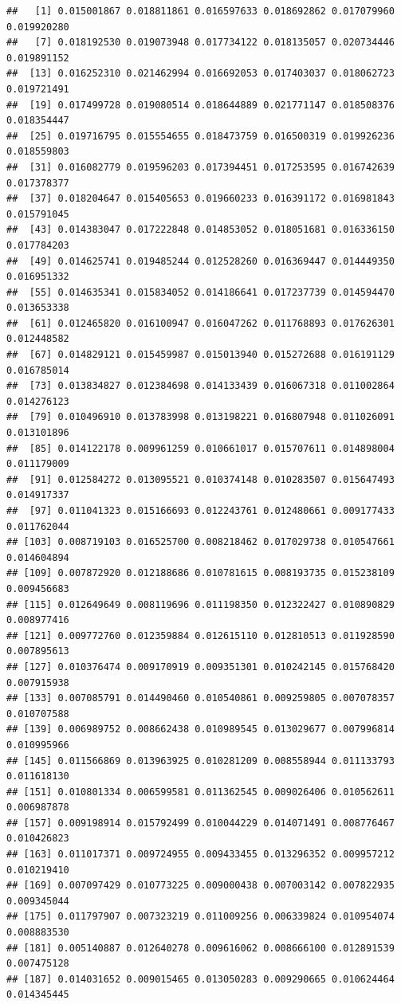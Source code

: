 \documentclass[
]{article}
\begin{document}
\begin{verbatim}
##   [1] 0.015001867 0.018811861 0.016597633 0.018692862 0.017079960 0.019920280
##   [7] 0.018192530 0.019073948 0.017734122 0.018135057 0.020734446 0.019891152
##  [13] 0.016252310 0.021462994 0.016692053 0.017403037 0.018062723 0.019721491
##  [19] 0.017499728 0.019080514 0.018644889 0.021771147 0.018508376 0.018354447
##  [25] 0.019716795 0.015554655 0.018473759 0.016500319 0.019926236 0.018559803
##  [31] 0.016082779 0.019596203 0.017394451 0.017253595 0.016742639 0.017378377
##  [37] 0.018204647 0.015405653 0.019660233 0.016391172 0.016981843 0.015791045
##  [43] 0.014383047 0.017222848 0.014853052 0.018051681 0.016336150 0.017784203
##  [49] 0.014625741 0.019485244 0.012528260 0.016369447 0.014449350 0.016951332
##  [55] 0.014635341 0.015834052 0.014186641 0.017237739 0.014594470 0.013653338
##  [61] 0.012465820 0.016100947 0.016047262 0.011768893 0.017626301 0.012448582
##  [67] 0.014829121 0.015459987 0.015013940 0.015272688 0.016191129 0.016785014
##  [73] 0.013834827 0.012384698 0.014133439 0.016067318 0.011002864 0.014276123
##  [79] 0.010496910 0.013783998 0.013198221 0.016807948 0.011026091 0.013101896
##  [85] 0.014122178 0.009961259 0.010661017 0.015707611 0.014898004 0.011179009
##  [91] 0.012584272 0.013095521 0.010374148 0.010283507 0.015647493 0.014917337
##  [97] 0.011041323 0.015166693 0.012243761 0.012480661 0.009177433 0.011762044
## [103] 0.008719103 0.016525700 0.008218462 0.017029738 0.010547661 0.014604894
## [109] 0.007872920 0.012188686 0.010781615 0.008193735 0.015238109 0.009456683
## [115] 0.012649649 0.008119696 0.011198350 0.012322427 0.010890829 0.008977416
## [121] 0.009772760 0.012359884 0.012615110 0.012810513 0.011928590 0.007895613
## [127] 0.010376474 0.009170919 0.009351301 0.010242145 0.015768420 0.007915938
## [133] 0.007085791 0.014490460 0.010540861 0.009259805 0.007078357 0.010707588
## [139] 0.006989752 0.008662438 0.010989545 0.013029677 0.007996814 0.010995966
## [145] 0.011566869 0.013963925 0.010281209 0.008558944 0.011133793 0.011618130
## [151] 0.010801334 0.006599581 0.011362545 0.009026406 0.010562611 0.006987878
## [157] 0.009198914 0.015792499 0.010044229 0.014071491 0.008776467 0.010426823
## [163] 0.011017371 0.009724955 0.009433455 0.013296352 0.009957212 0.010219410
## [169] 0.007097429 0.010773225 0.009000438 0.007003142 0.007822935 0.009345044
## [175] 0.011797907 0.007323219 0.011009256 0.006339824 0.010954074 0.008883530
## [181] 0.005140887 0.012640278 0.009616062 0.008666100 0.012891539 0.007475128
## [187] 0.014031652 0.009015465 0.013050283 0.009290665 0.010624464 0.014345445

\end{verbatim}
\end{document}
